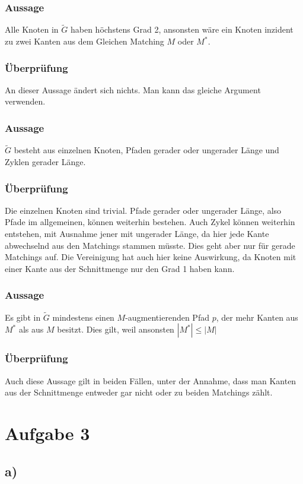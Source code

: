 \documentclass[a4paper,11pt,twoside]{scrartcl}
\begin{document}
\subsubsection*{Aussage}
Alle Knoten in $\tilde{G}$ haben höchstens Grad 2, ansonsten wäre ein Knoten inzident zu zwei Kanten aus dem Gleichen Matching $M$ oder $M^*$.
\subsubsection*{Überprüfung}
An dieser Aussage ändert sich nichts. Man kann das gleiche Argument verwenden.

\subsubsection*{Aussage}
$\tilde{G}$ besteht aus einzelnen Knoten, Pfaden gerader oder ungerader Länge und Zyklen gerader Länge.
\subsubsection*{Überprüfung}
Die einzelnen Knoten sind trivial. Pfade gerader oder ungerader Länge, also Pfade im allgemeinen, können weiterhin bestehen. Auch Zykel können weiterhin entstehen, mit Ausnahme jener mit ungerader Länge, da hier jede Kante abwechselnd aus den Matchings stammen müsste. Dies geht aber nur für gerade Matchings auf. Die Vereinigung hat auch hier keine Auswirkung, da Knoten mit einer Kante aus der Schnittmenge nur den Grad 1 haben kann.

\subsubsection*{Aussage}
Es gibt in $\tilde{G}$ mindestens einen $M$-augmentierenden Pfad $p$, der mehr Kanten aus $M^*$ als aus $M$ besitzt. Dies gilt, weil ansonsten $|M^*| \leq |M|$
\subsubsection*{Überprüfung}
Auch diese Aussage gilt in beiden Fällen, unter der Annahme, dass man Kanten aus der Schnittmenge entweder gar nicht oder zu beiden Matchings zählt.
\section*{Aufgabe 3}
\subsection*{a)} 
\end{document}
